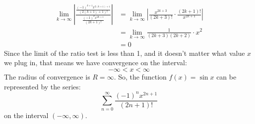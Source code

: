 \documentclass{report}
\begin{document}
        \begin{align*}
            \lim_{k \to \infty} \left| \frac{\frac{(-1)^{k+1} x^{2(k+1)+1}}{(2(k+1)+1)!}}{\frac{(-1)^k x^{2k+1}}{(2k+1)!}}\right|
            &= \lim_{k \to \infty} \left| \frac{x^{2k+3}}{(2k+3)!} \cdot \frac{(2k+1)!}{x^{2k+1}} \right| \\
            &= \lim_{k \to \infty} \frac{1}{(2k+3)(2k+2)} \cdot x^2 \\
            &= 0
        \end{align*}
        Since the limit of the ratio test is less than 1, and it doesn't matter what value \(x\) we plug in, that means we have convergence on the interval:
        \[- \infty < x < \infty\]
        The radius of convergence is \(R = \infty\).
        So, the function \(f(x) = \sin x\) can be represented by the series:
        \[\sum_{n=0}^{\infty}  \frac{(-1)^n x^{2n+1}}{(2n+1)!}\]
        on the interval \((- \infty, \infty)\).
    
\end{document}
